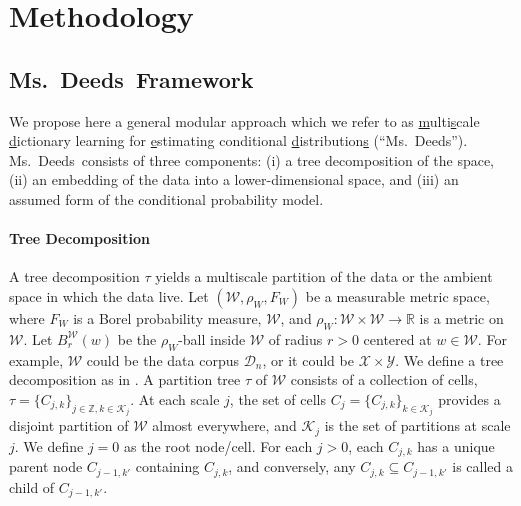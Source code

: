 \documentclass{article} %
\newcommand{\Real}{\mathbb{R}}
\providecommand{\mc}[1]{\mathcal{#1}}
\newcommand{\from}{{\ensuremath{\colon}}}  %
\newcommand{\msd}{Ms.~Deeds}
\newcommand{\ZZ}{\mathbb{Z}}
\begin{document}
\section{Methodology} \label{sec:method}

\subsection{\msd~Framework} \label{sub:method}

We propose here a general modular approach which we refer to as \uline{m}ulti\uline{s}cale \uline{d}ictionary learning for \uline{e}stimating conditional \uline{d}istribution\uline{s} (``\msd''). \msd~consists of three components: (i) a tree decomposition of the space, (ii) an embedding of the data into a lower-dimensional space,  and (iii) an assumed form of the conditional probability model. 

\paragraph{Tree Decomposition}
A tree decomposition $\tau$ yields a multiscale partition of the data or the ambient space in which the data live.
Let $(\mc{W},\rho_W, F_W)$ be a measurable metric space, where $F_W$ is a Borel probability measure, $\mc{W}$, and $\rho_W \from \mc{W} \times \mc{W} \to \Real$ is a metric on $\mc{W}$.  Let $B_r^{\mc{W}}(w)$ be the $\rho_W$-ball inside $\mc{W}$ of radius $r > 0$ centered at $w \in \mc{W}$. For example, $\mc{W}$ could be the data corpus $\mc{D}_n$, or it could be $\mc{X} \times \mc{Y}$. We define a tree decomposition as in \cite{Allard2012,ChenMaggioni12}.  A partition tree $\tau$ of $\mc{W}$ consists of a collection of cells, $\tau=\{C_{j,k}\}_{j \in \ZZ, k \in \mc{K}_j}$.  At each scale $j$, the set of cells $C_j=\{C_{j,k}\}_{k \in \mc{K}_j}$ provides a disjoint partition of $\mc{W}$ almost everywhere, and $\mc{K}_j$ is the set of partitions at scale $j$.  We define $j=0$ as the root node/cell.  For each $j > 0$,  each $C_{j,k}$ has a unique parent node $C_{j-1,k'}$ containing $C_{j,k}$, and conversely, any $C_{j,k} \subseteq C_{j-1,k'}$ is called a child of $C_{j-1,k'}$.
\end{document}
